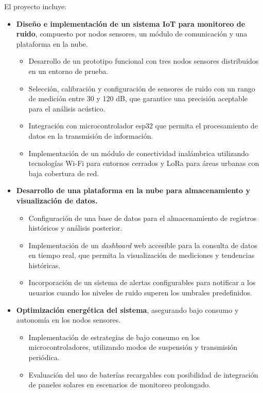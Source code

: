 \documentclass[
11pt, %
]{charter}
\begin{document}
El proyecto incluye:
\begin{itemize}
    \item \textbf{Diseño e implementación de un sistema IoT para monitoreo de ruido}, compuesto por nodos sensores, un módulo de comunicación y una plataforma en la nube.
    \begin{itemize}
        \item Desarrollo de un prototipo funcional con tres nodos sensores distribuidos en un entorno de prueba.
        \item Selección, calibración y configuración de sensores de ruido con un rango de medición entre 30 y 120 dB, 
        que garantice una precisión aceptable para el análisis acústico.
        \item Integración con microcontrolador esp32 que permita el procesamiento de datos en la transmisión de información.
        \item Implementación de un módulo de conectividad inalámbrica utilizando tecnologías Wi-Fi para entornos cerrados y LoRa para áreas urbanas con baja cobertura de red.
    \end{itemize}
    
    \item \textbf{Desarrollo de una plataforma en la nube para almacenamiento y visualización de datos.}
    \begin{itemize}
        \item Configuración de una base de datos para el almacenamiento de registros históricos y análisis posterior.
        \item Implementación de un \textit{dashboard} web accesible para la consulta de datos en tiempo real, que permita la visualización de mediciones y tendencias históricas.
        \item Incorporación de un sistema de alertas configurables para notificar a los usuarios cuando los niveles de ruido superen los umbrales predefinidos.
    \end{itemize}
    
    \item \textbf{Optimización energética del sistema}, asegurando bajo consumo y autonomía en los nodos sensores.
    \begin{itemize}
        \item Implementación de estrategias de bajo consumo en los microcontroladores, utilizando modos de suspensión y transmisión periódica.
        \item Evaluación del uso de baterías recargables con posibilidad de integración de paneles solares en escenarios de monitoreo prolongado.
    \end{itemize}
    
\end{itemize}
\end{document}
